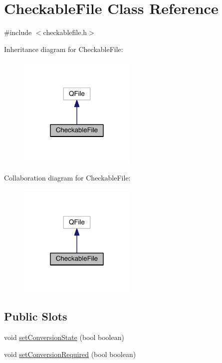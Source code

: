 \hypertarget{class_checkable_file}{}\section{Checkable\+File Class Reference}
\label{class_checkable_file}


{\ttfamily \#include $<$checkablefile.\+h$>$}



Inheritance diagram for Checkable\+File\+:
\nopagebreak
\begin{figure}[H]
\begin{center}
\leavevmode
\includegraphics[width=159pt]{class_checkable_file__inherit__graph}
\end{center}
\end{figure}


Collaboration diagram for Checkable\+File\+:
\nopagebreak
\begin{figure}[H]
\begin{center}
\leavevmode
\includegraphics[width=159pt]{class_checkable_file__coll__graph}
\end{center}
\end{figure}
\subsection*{Public Slots}
\begin{DoxyCompactItemize}
\item 
void \hyperlink{class_checkable_file_ac2436dd7ef1249c9cf5c33829b054284}{set\+Conversion\+State} (bool boolean)
\item 
void \hyperlink{class_checkable_file_a7edb6361bcdba016c76be3d9c3906d9e}{set\+Conversion\+Required} (bool boolean)
\end{DoxyCompactItemize}
